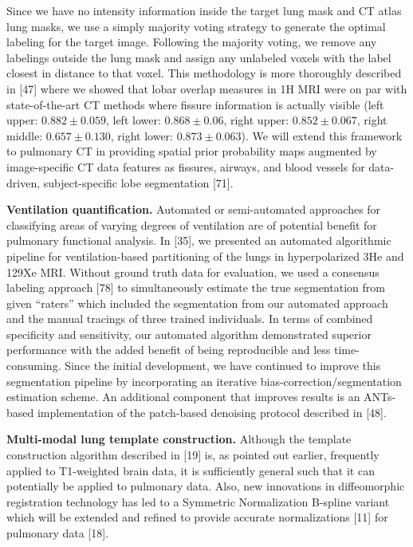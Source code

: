 \documentclass[11pt,]{article}
\begin{document}
Since we have no intensity information inside the target lung mask and
CT atlas lung masks, we use a simply majority voting strategy to
generate the optimal labeling for the target image. Following the
majority voting, we remove any labelings outside the lung mask and
assign any unlabeled voxels with the label closest in distance to that
voxel. This methodology is more thoroughly described in {[}47{]} where
we showed that lobar overlap measures in 1H MRI were on par with
state-of-the-art CT methods where fissure information is actually
visible (left upper: $0.882 \pm 0.059$, left lower: $0.868 \pm 0.06$,
right upper: $0.852 \pm 0.067$, right middle: $0.657 \pm 0.130$, right
lower: $0.873 \pm 0.063$). We will extend this framework to pulmonary CT
in providing spatial prior probability maps augmented by image-specific
CT data features as fissures, airways, and blood vessels for
data-driven, subject-specific lobe segmentation {[}71{]}.

\textbf{Ventilation quantification.} Automated or semi-automated
approaches for classifying areas of varying degrees of ventilation are
of potential benefit for pulmonary functional analysis. In {[}35{]}, we
presented an automated algorithmic pipeline for ventilation-based
partitioning of the lungs in hyperpolarized 3He and 129Xe MRI. Without
ground truth data for evaluation, we used a consensus labeling approach
{[}78{]} to simultaneously estimate the true segmentation from given
``raters'' which included the segmentation from our automated approach
and the manual tracings of three trained individuals. In terms of
combined specificity and sensitivity, our automated algorithm
demonstrated superior performance with the added benefit of being
reproducible and less time-consuming. Since the initial development, we
have continued to improve this segmentation pipeline by incorporating an
iterative bias-correction/segmentation estimation scheme. An additional
component that improves results is an ANTs-based implementation of the
patch-based denoising protocol described in {[}48{]}.

\textbf{Multi-modal lung template construction.} Although the template
construction algorithm described in {[}19{]} is, as pointed out earlier,
frequently applied to T1-weighted brain data, it is sufficiently general
such that it can potentially be applied to pulmonary data. Also, new
innovations in diffeomorphic registration technology has led to a
Symmetric Normalization B-spline variant which will be extended and
refined to provide accurate normalizations {[}11{]} for pulmonary data
{[}18{]}.
\end{document}
